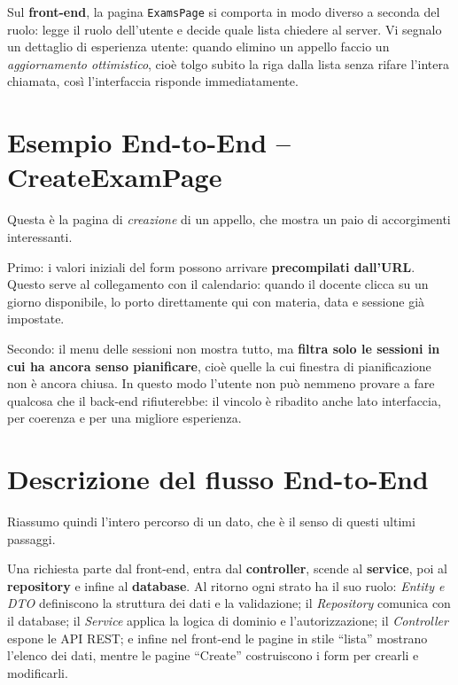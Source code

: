 \documentclass[11pt]{article}
\begin{document}
Sul \textbf{front-end}, la pagina \texttt{ExamsPage} si comporta in modo diverso a
seconda del ruolo: legge il ruolo dell'utente e decide quale lista chiedere al server.
Vi segnalo un dettaglio di esperienza utente: quando elimino un appello faccio un
\emph{aggiornamento ottimistico}, cioè tolgo subito la riga dalla lista senza rifare
l'intera chiamata, così l'interfaccia risponde immediatamente.

\section*{Esempio End-to-End -- CreateExamPage}

Questa è la pagina di \emph{creazione} di un appello, che mostra un paio di accorgimenti
interessanti.

Primo: i valori iniziali del form possono arrivare \textbf{precompilati dall'URL}. Questo
serve al collegamento con il calendario: quando il docente clicca su un giorno
disponibile, lo porto direttamente qui con materia, data e sessione già impostate.

Secondo: il menu delle sessioni non mostra tutto, ma \textbf{filtra solo le sessioni in
cui ha ancora senso pianificare}, cioè quelle la cui finestra di pianificazione non è
ancora chiusa. In questo modo l'utente non può nemmeno provare a fare qualcosa che il
back-end rifiuterebbe: il vincolo è ribadito anche lato interfaccia, per coerenza e per
una migliore esperienza.

\section*{Descrizione del flusso End-to-End}

Riassumo quindi l'intero percorso di un dato, che è il senso di questi ultimi passaggi.

Una richiesta parte dal front-end, entra dal \textbf{controller}, scende al
\textbf{service}, poi al \textbf{repository} e infine al \textbf{database}. Al ritorno
ogni strato ha il suo ruolo: \emph{Entity e DTO} definiscono la struttura dei dati e la
validazione; il \emph{Repository} comunica con il database; il \emph{Service} applica la
logica di dominio e l'autorizzazione; il \emph{Controller} espone le API REST; e infine
nel front-end le pagine in stile ``lista'' mostrano l'elenco dei dati, mentre le pagine
``Create'' costruiscono i form per crearli e modificarli.
\end{document}
